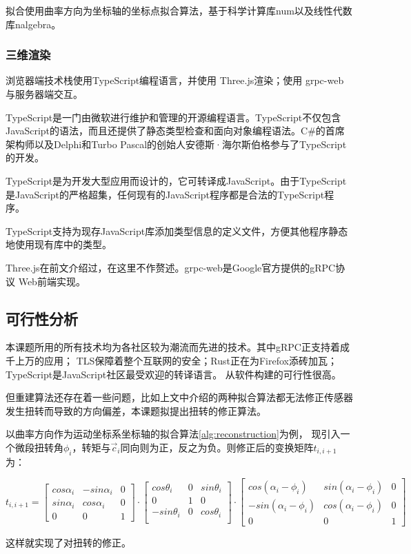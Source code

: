 拟合使用曲率方向为坐标轴的坐标点拟合算法，基于科学计算库num以及线性代数库nalgebra。

\subsubsection{三维渲染}

浏览器端技术栈使用TypeScript编程语言，并使用 Three.js渲染；使用 grpc-web 与服务器端交互。

TypeScript是一门由微软进行维护和管理的开源编程语言。TypeScript不仅包含JavaScript的语法，而且还提供了静态类型检查和面向对象编程语法。C\#的首席架构师以及Delphi和Turbo Pascal的创始人安德斯·海尔斯伯格参与了TypeScript的开发。

TypeScript是为开发大型应用而设计的，它可转译成JavaScript。由于TypeScript是JavaScript的严格超集，任何现有的JavaScript程序都是合法的TypeScript程序。

TypeScript支持为现存JavaScript库添加类型信息的定义文件，方便其他程序静态地使用现有库中的类型。

Three.js在前文介绍过，在这里不作赘述。grpc-web是Google官方提供的gRPC协议 Web前端实现。

\subsection{可行性分析}

本课题所用的所有技术均为各社区较为潮流而先进的技术。其中gRPC正支持着成千上万的应用；
TLS保障着整个互联网的安全；Rust正在为Firefox添砖加瓦；TypeScript是JavaScript社区最受欢迎的转译语言。
从软件构建的可行性很高。

但重建算法还存在着一些问题，比如上文中介绍的两种拟合算法都无法修正传感器发生扭转而导致的方向偏差，本课题拟提出扭转的修正算法。

以曲率方向作为运动坐标系坐标轴的拟合算法\ref{alg:reconstruction}为例，
现引入一个微段扭转角$\phi_i$，转矩与$\vec c_i$同向则为正，反之为负。则修正后的变换矩阵$t_{i, i+1}$为：

\begin{equation}
t_{i, i+1} = \left[
    \begin{matrix}
        cos \alpha_i & -sin \alpha_i & 0 \\
        sin \alpha_i & cos \alpha_i & 0 \\
        0 & 0 & 1
    \end{matrix}
    \right]
    \cdot
    \left[
    \begin{matrix}
        cos \theta_i & 0 & sin \theta_i \\
        0 & 1 & 0 \\
        -sin \theta_i & 0 & cos \theta_i \\
    \end{matrix}
    \right]
    \cdot
    \left[
    \begin{matrix}
        cos (\alpha_i - \phi_i) & sin (\alpha_i - \phi_i) & 0 \\
        -sin (\alpha_i - \phi_i) & cos (\alpha_i - \phi_i) & 0 \\
        0 & 0 & 1
    \end{matrix}
\right]
\end{equation}

这样就实现了对扭转的修正。